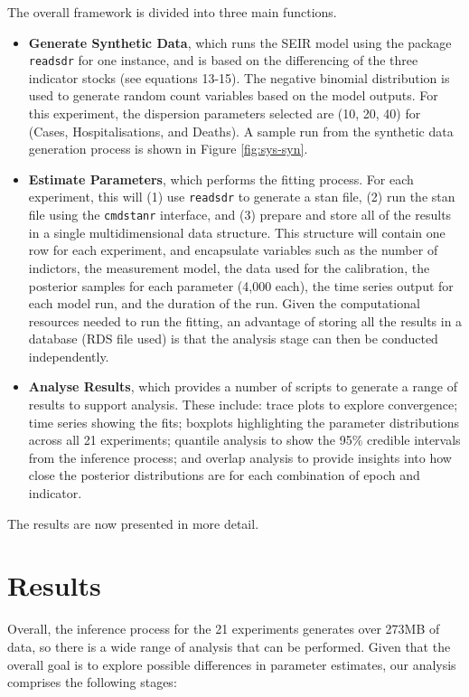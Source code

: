 \documentclass[10pt,letterpaper]{article}
\begin{document}
The overall framework is divided into three main functions.

\begin{itemize}
\item
  \textbf{Generate Synthetic Data}, which runs the SEIR model using the package \texttt{readsdr} for one instance, and is based on the differencing of the three indicator stocks (see equations 13-15). The negative binomial distribution is used to generate random count variables based on the model outputs. For this experiment, the dispersion parameters selected are (10, 20, 40) for (Cases, Hospitalisations, and Deaths). A sample run from the synthetic data generation process is shown in Figure \ref{fig:sys-syn}.
\item
  \textbf{Estimate Parameters}, which performs the fitting process. For each experiment, this will (1) use \texttt{readsdr} to generate a stan file, (2) run the stan file using the \texttt{cmdstanr} interface, and (3) prepare and store all of the results in a single multidimensional data structure. This structure will contain one row for each experiment, and encapsulate variables such as the number of indictors, the measurement model, the data used for the calibration, the posterior samples for each parameter (4,000 each), the time series output for each model run, and the duration of the run. Given the computational resources needed to run the fitting, an advantage of storing all the results in a database (RDS file used) is that the analysis stage can then be conducted independently.
\item
  \textbf{Analyse Results}, which provides a number of scripts to generate a range of results to support analysis. These include: trace plots to explore convergence; time series showing the fits; boxplots highlighting the parameter distributions across all 21 experiments; quantile analysis to show the 95\% credible intervals from the inference process; and overlap analysis to provide insights into how close the posterior distributions are for each combination of epoch and indicator.
\end{itemize}

The results are now presented in more detail.

\hypertarget{results}{%
\section{Results}\label{results}}

Overall, the inference process for the 21 experiments generates over 273MB of data, so there is a wide range of analysis that can be performed. Given that the overall goal is to explore possible differences in parameter estimates, our analysis comprises the following stages:
\end{document}
